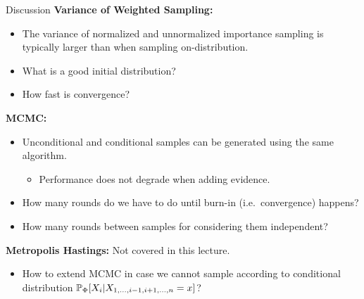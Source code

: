 \begin{frame}{Discussion}
    \textbf{Variance of Weighted Sampling:}
    \begin{itemize}
        \pause \item The variance of normalized and unnormalized importance sampling is typically larger than when sampling on-distribution.
        \pause \item What is a good initial distribution?
        \pause \item How fast is convergence?
    \end{itemize}
    \textbf{MCMC:}
    \begin{itemize}
        \pause \item Unconditional and conditional samples can be generated using the same algorithm.
        \begin{itemize}
            \pause \item Performance does not degrade when adding evidence.
        \end{itemize}
        \pause \item How many rounds do we have to do until burn-in (i.e.\ convergence) happens?
        \pause \item How many rounds between samples for considering them independent?
    \end{itemize}
    \pause \textbf{Metropolis Hastings:} Not covered in this lecture.
    \begin{itemize}
        \pause \item How to extend MCMC in case we cannot sample according to conditional distribution $\Pb_{\Phi}[X_i | X_{1,\ldots,i-1,i+1,\ldots,n} = x]$?
    \end{itemize}
    
\end{frame}